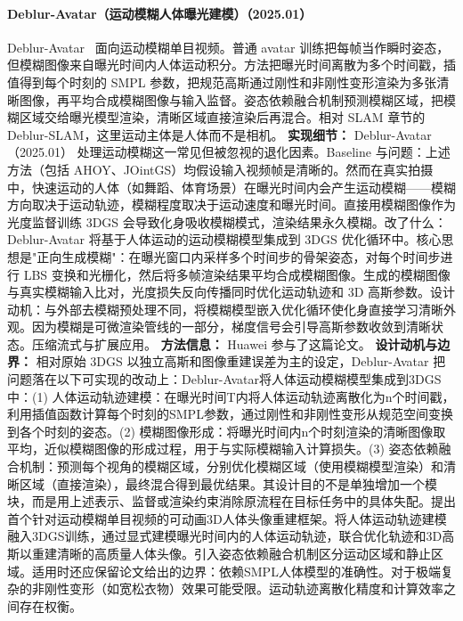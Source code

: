 \paragraph{Deblur-Avatar（运动模糊人体曝光建模）（2025.01）}
Deblur-Avatar~\cite{2501_13335} 面向运动模糊单目视频。普通 avatar 训练把每帧当作瞬时姿态，但模糊图像来自曝光时间内人体运动积分。方法把曝光时间离散为多个时间戳，插值得到每个时刻的 SMPL 参数，把规范高斯通过刚性和非刚性变形渲染为多张清晰图像，再平均合成模糊图像与输入监督。姿态依赖融合机制预测模糊区域，把模糊区域交给曝光模型渲染，清晰区域直接渲染后再混合。相对 SLAM 章节的 Deblur-SLAM，这里运动主体是人体而不是相机。
\textbf{实现细节：} Deblur-Avatar（2025.01） 处理运动模糊这一常见但被忽视的退化因素。Baseline 与问题：上述方法（包括 AHOY、JOintGS）均假设输入视频帧是清晰的。然而在真实拍摄中，快速运动的人体（如舞蹈、体育场景）在曝光时间内会产生运动模糊——模糊方向取决于运动轨迹，模糊程度取决于运动速度和曝光时间。直接用模糊图像作为光度监督训练 3DGS 会导致化身吸收模糊模式，渲染结果永久模糊。改了什么：Deblur-Avatar 将基于人体运动的运动模糊模型集成到 3DGS 优化循环中。核心思想是"正向生成模糊"：在曝光窗口内采样多个时间步的骨架姿态，对每个时间步进行 LBS 变换和光栅化，然后将多帧渲染结果平均合成模糊图像。生成的模糊图像与真实模糊输入比对，光度损失反向传播同时优化运动轨迹和 3D 高斯参数。设计动机：与外部去模糊预处理不同，将模糊模型嵌入优化循环使化身直接学习清晰外观。因为模糊是可微渲染管线的一部分，梯度信号会引导高斯参数收敛到清晰状态。压缩流式与扩展应用。
\textbf{方法信息：} Huawei 参与了这篇论文。
\textbf{设计动机与边界：} 相对原始 3DGS 以独立高斯和图像重建误差为主的设定，Deblur-Avatar 把问题落在以下可实现的改动上：Deblur-Avatar将人体运动模糊模型集成到3DGS中：(1) 人体运动轨迹建模：在曝光时间T内将人体运动轨迹离散化为n个时间戳，利用插值函数计算每个时刻的SMPL参数，通过刚性和非刚性变形从规范空间变换到各个时刻的姿态。(2) 模糊图像形成：将曝光时间内n个时刻渲染的清晰图像取平均，近似模糊图像的形成过程，用于与实际模糊输入计算损失。(3) 姿态依赖融合机制：预测每个视角的模糊区域，分别优化模糊区域（使用模糊模型渲染）和清晰区域（直接渲染），最终混合得到最优结果。其设计目的不是单独增加一个模块，而是用上述表示、监督或渲染约束消除原流程在目标任务中的具体失配。提出首个针对运动模糊单目视频的可动画3D人体头像重建框架。将人体运动轨迹建模融入3DGS训练，通过显式建模曝光时间内的人体运动轨迹，联合优化轨迹和3D高斯以重建清晰的高质量人体头像。引入姿态依赖融合机制区分运动区域和静止区域。适用时还应保留论文给出的边界：依赖SMPL人体模型的准确性。对于极端复杂的非刚性变形（如宽松衣物）效果可能受限。运动轨迹离散化精度和计算效率之间存在权衡。
